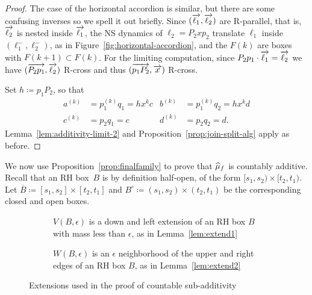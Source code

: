\begin{proof}
The case of the horizontal accordion is similar, but there are some
confusing inverses so we spell it out briefly.
Since $(\overrightarrow{\ell_1},\overrightarrow{\ell_2})$ are R-parallel, that is, $\overrightarrow{\ell_2}$ is nested inside $\overrightarrow{\ell_1}$, the NS dynamics of $\ell_2 = P_2 x p_2$ translate
$\ell_1$ inside $(\ell_1^-,\ell_2^-)$, as in
Figure~\ref{fig:horizontal-accordion}, and the $F(k)$ are boxes with
$F(k+1) \subset F(k)$.
For the limiting computation, since
$P_2 p_1 \cdot \overrightarrow{\ell_1} = \overrightarrow{\ell_2}$ we have
$(\overrightarrow{P_2p_1}, \overrightarrow{\ell_2})$ R-cross and thus
$(\overrightarrow{p_1 P_2}, \overrightarrow{x})$ R-cross.

Set $h \coloneqq p_1 P_2$, so that
\begin{align*}
  a^{(k)} &= p_1^{(k)} q_1 = h x^k c &
  b^{(k)} &= p_1^{(k)} q_2 = h x^k d\\
  c^{(k)} &= p_2 q_1 = c &
  d^{(k)} &= p_2 q_2 = d.
\end{align*}
Lemma~\ref{lem:additivity-limit-2} and
Proposition~\ref{prop:join-split-alg} apply as before.
\end{proof}

  \begin{figure}
\end{figure}

We now use Proposition~\ref{prop:finalfamily} to prove that $\widehat{\mu}_f$
is countably additive.
Recall that an RH box~$B$ is by definition half-open, of the form
$[s_1,s_2) \times [t_2,t_1)$. Let
$\overline{B} \coloneqq [s_1,s_2] \times [t_2,t_1]$ and
$B^\circ \coloneqq (s_1,s_2) \times (t_2,t_1)$ be the corresponding
closed and open boxes.


\begin{figure}
     \centering
     \begin{subfigure}[b]{0.47\textwidth}
        \caption{$V(B,\epsilon)$ is a down and left extension of an RH
          box $B$ with mass less than $\epsilon$, as in Lemma~\ref{lem:extend1}}\label{fig:ca1}
     \end{subfigure}
     \hfill
     \begin{subfigure}[b]{0.47\textwidth}
        \caption{$W(B,\epsilon)$ is an $\epsilon$ neighborhood of the upper and right edges of an RH box $B$, as in Lemma~\ref{lem:extend2}}\label{fig:ca2}
     \end{subfigure}
     \caption{Extensions used in the proof of countable sub-additivity}
     \label{fig:cases}
\end{figure}


